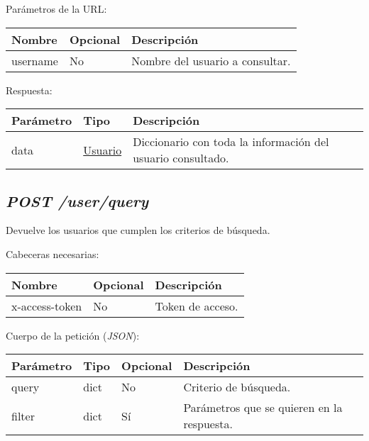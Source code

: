 Parámetros de la URL:
\begin{table}[h!]
	\centering
	\begin{adjustbox}{max width=\textwidth}
	\begin{tabular}{|l|l|l|}
		\hline
		Nombre & Opcional & Descripción \\ \hline
		username & No & Nombre del usuario a consultar. \\ \hline
	\end{tabular}
\end{adjustbox}
\end{table}

Respuesta:
\begin{table}[h!]
	\centering
	\begin{adjustbox}{max width=\textwidth}
	\begin{tabularx}{\linewidth}{|l|l|L|}
		\hline
		Parámetro & Tipo & Descripción \\ \hline
		data & \hyperref[sec:usuario]{Usuario} & Diccionario con toda la información del usuario consultado. \\ \hline
	\end{tabularx}
\end{adjustbox}
\end{table}



\subsection{\textit{POST /user/query}}
Devuelve los usuarios que cumplen los criterios de búsqueda.

Cabeceras necesarias:
\begin{table}[h!]
	\centering
	\begin{adjustbox}{max width=\textwidth}
	\begin{tabular}{|l|l|l|}
		\hline
		Nombre & Opcional & Descripción \\ \hline
		x-access-token & No & Token de acceso. \\ \hline
	\end{tabular}
\end{adjustbox}
\end{table}


\pagebreak
Cuerpo de la petición (\textit{JSON}):
\begin{table}[h!]
	\centering
	\begin{adjustbox}{max width=\textwidth}
	\begin{tabular}{|l|l|l|l|}
		\hline
		Parámetro & Tipo & Opcional & Descripción \\ \hline
		query & dict & No & Criterio de búsqueda. \\ \hline
		filter & dict & Sí & Parámetros que se quieren en la respuesta. \\ \hline
	\end{tabular}
\end{adjustbox}
\end{table}

